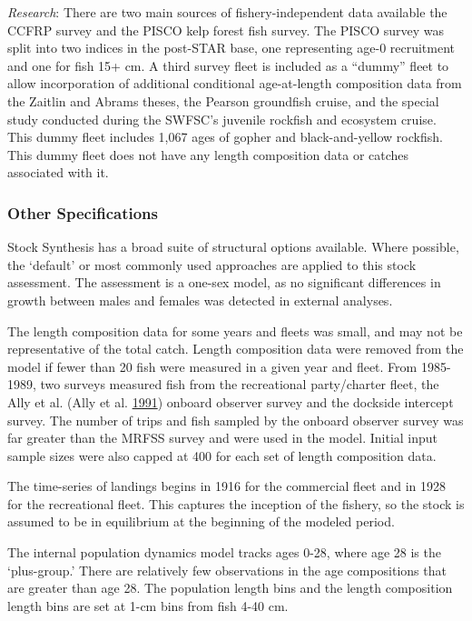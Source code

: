 \documentclass[12pt,]{article}
\begin{document}
\emph{Research}: There are two main sources of fishery-independent data
available the CCFRP survey and the PISCO kelp forest fish survey. The
PISCO survey was split into two indices in the post-STAR base, one
representing age-0 recruitment and one for fish 15+ cm. A third survey
fleet is included as a ``dummy'' fleet to allow incorporation of
additional conditional age-at-length composition data from the Zaitlin
and Abrams theses, the Pearson groundfish cruise, and the special study
conducted during the SWFSC's juvenile rockfish and ecosystem cruise.
This dummy fleet includes 1,067 ages of gopher and black-and-yellow
rockfish. This dummy fleet does not have any length composition data or
catches associated with it.

\subsubsection{Other Specifications}\label{other-specifications}

Stock Synthesis has a broad suite of structural options available. Where
possible, the `default' or most commonly used approaches are applied to
this stock assessment. The assessment is a one-sex model, as no
significant differences in growth between males and females was detected
in external analyses.

The length composition data for some years and fleets was small, and may
not be representative of the total catch. Length composition data were
removed from the model if fewer than 20 fish were measured in a given
year and fleet. From 1985-1989, two surveys measured fish from the
recreational party/charter fleet, the Ally et al. (Ally et al.
\protect\hyperlink{ref-Ally1991}{1991}) onboard observer survey and the
dockside intercept survey. The number of trips and fish sampled by the
onboard observer survey was far greater than the MRFSS survey and were
used in the model. Initial input sample sizes were also capped at 400
for each set of length composition data.

The time-series of landings begins in 1916 for the commercial fleet and
in 1928 for the recreational fleet. This captures the inception of the
fishery, so the stock is assumed to be in equilibrium at the beginning
of the modeled period.

The internal population dynamics model tracks ages 0-28, where age 28 is
the `plus-group.' There are relatively few observations in the age
compositions that are greater than age 28. The population length bins
and the length composition length bins are set at 1-cm bins from fish
4-40 cm.
\end{document}
